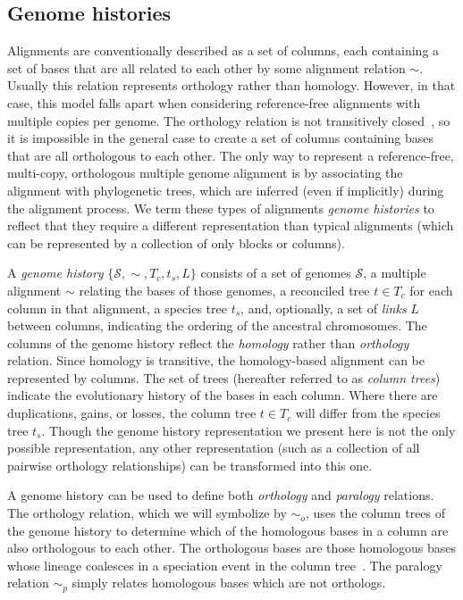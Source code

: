 \documentclass[fleqn,10pt]{wlscirep}
\begin{document}
\subsection*{Genome histories}
Alignments are conventionally described as a set of columns, each containing a set of bases that are all related to each other by some alignment relation $\sim$.
Usually this relation represents orthology rather than homology.
However, in that case, this model falls apart when considering reference-free alignments with multiple copies per genome.
The orthology relation is not transitively closed~\cite{Koonin2005}, so it is impossible in the general case to create a set of columns containing bases that are all orthologous to each other.
The only way to represent a reference-free, multi-copy, orthologous multiple genome alignment is by associating the alignment with phylogenetic trees, which are inferred (even if implicitly) during the alignment process.
We term these types of alignments \emph{genome histories} to reflect that they require a different representation than typical alignments (which can be represented by a collection of only blocks or columns).

A \emph{genome history} $\{\mathcal{S}, \sim, T_c, t_s, L\}$ consists of a set of genomes $\mathcal{S}$, a multiple alignment $\sim$ relating the bases of those genomes, a reconciled tree $t \in T_c$ for each column in that alignment, a species tree $t_s$, and, optionally, a set of \emph{links} $L$ between columns, indicating the ordering of the ancestral chromosomes.
The columns of the genome history reflect the \emph{homology} rather than \emph{orthology} relation.
Since homology is transitive, the homology-based alignment can be represented by columns.
The set of trees (hereafter referred to as \emph{column trees}) indicate the evolutionary history of the bases in each column.
Where there are duplications, gains, or losses, the column tree $t \in T_c$ will differ from the species tree $t_s$.
Though the genome history representation we present here is not the only possible representation, any other representation (such as a collection of all pairwise orthology relationships) can be transformed into this one.

A genome history can be used to define both \emph{orthology} and \emph{paralogy} relations.
The orthology relation, which we will symbolize by $\sim_o$, uses the column trees of the genome history to determine which of the homologous bases in a column are also orthologous to each other.
The orthologous bases are those homologous bases whose lineage coalesces in a speciation event in the column tree~\cite{Koonin2005}.
The paralogy relation $\sim_p$ simply relates homologous bases which are not orthologs.
\end{document}
